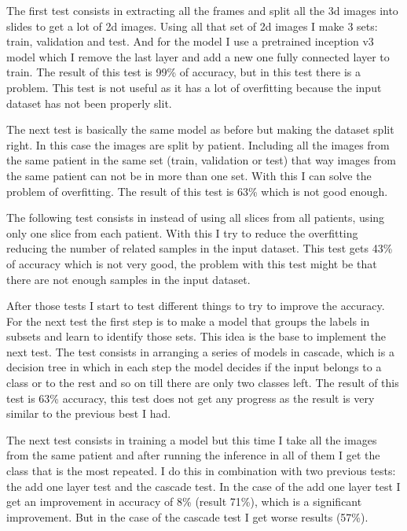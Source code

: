 \documentclass[12pt,a4paper]{article}
\begin{document}
The first test consists in extracting all the frames and split all the 3d images into slides to get a lot of 2d images. Using all that set of 2d images I make 3 sets: train, validation and test. And for the model I use a pretrained inception v3 model which I remove the last layer and add a new one fully connected layer to train. The result of this test is 99\% of accuracy, but in this test there is a problem. This test is not useful as it has a lot of overfitting because the input dataset has not been properly slit.
\bigskip

The next test is basically the same model as before but making the dataset split right. In this case the images are split by patient. Including all the images from the same patient in the same set (train, validation or test) that way images from the same patient can not be in more than one set. With this I can solve the problem of overfitting. The result of this test is 63\% which is not good enough.
\bigskip

The following test consists in instead of using all slices from all patients, using only one slice from each patient. With this I try to reduce the overfitting reducing the number of related samples in the input dataset. This test gets 43\% of accuracy which is not very good, the problem with this test might be that there are not enough samples in the input dataset.
\bigskip

After those tests I start to test different things to try to improve the accuracy. For the next test the first step is to make a model that groups the labels in subsets and learn to identify those sets. This idea is the base to implement the next test. The test consists in arranging a series of models in cascade, which is a decision tree in which in each step the model decides if the input belongs to a class or to the rest and so on till there are only two classes left. The result of this test is 63\% accuracy, this test does not get any progress as the result is very similar to the previous best I had.
\bigskip

The next test consists in training a model but this time I take all the images from the same patient and after running the inference in all of them I get the class that is the most repeated. I do this in combination with two previous tests: the add one layer test and the cascade test. In the case of the add one layer test I get an improvement in accuracy of 8\% (result 71\%), which is a significant improvement. But in the case of the cascade test I get worse results (57\%).
\bigskip
\end{document}
